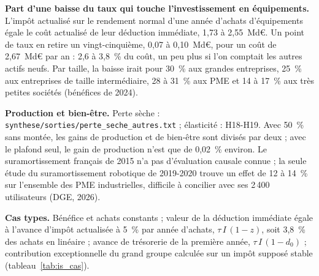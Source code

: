 \textbf{Part d'une baisse du taux qui touche l'investissement en équipements.} L'impôt actualisé sur le rendement normal
d'une année d'achats d'équipements égale le coût actualisé de leur déduction immédiate, 1,73 à 2,55~Md€. Un point de taux
en retire un vingt-cinquième, 0,07 à 0,10~Md€, pour un coût de 2,67~Md€ par an : 2,6 à 3,8~\% du coût, un peu plus si
l'on comptait les autres actifs neufs. Par taille, la baisse irait pour 30~\% aux grandes entreprises, 25~\% aux
entreprises de taille intermédiaire, 28 à 31~\% aux PME et 14 à 17~\% aux très petites sociétés (bénéfices de 2024).

\textbf{Production et bien-être.} Perte sèche : \texttt{synthese/sorties/perte\_seche\_autres.txt} ; élasticité :
H18-H19. Avec 50~\% sans montée, les gains de production et de bien-être sont divisés par deux ;
avec le plafond seul, le gain de production n'est que de 0,02~\% environ. Le suramortissement français de 2015 n'a pas
d'évaluation causale connue ; la seule étude du suramortissement robotique de 2019-2020 trouve un effet de 12 à 14~\%
sur l'ensemble des PME industrielles, difficile à concilier avec ses 2\,400 utilisateurs (DGE, 2026).

\textbf{Cas types.} Bénéfice et achats constants ; valeur de la déduction immédiate égale à l'avance d'impôt actualisée à
5~\% par année d'achats, $\tau\, I\,(1 - z)$, soit 3,8~\% des achats en linéaire ; avance de trésorerie de la première
année, $\tau\, I\,(1 - d_0)$ ; contribution exceptionnelle du grand groupe calculée sur un impôt supposé stable
(tableau~\ref{tab:is_cas}).


